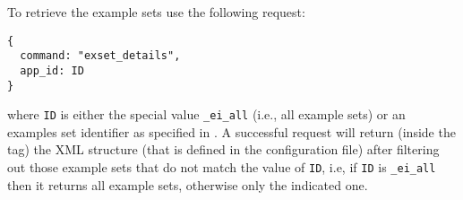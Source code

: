 To retrieve the example sets use the following request:

\bigskip
\begin{lstlisting}
{
  command: "exset_details",
  app_id: ID
}
\end{lstlisting}

\bigskip
\noindent
where \texttt{ID} is either the special value \texttt{\_ei\_all}
(i.e., all example sets) or an examples set identifier as specified in
.
%
A successful request will return (inside the  tag) the
XML structure  (that is defined in the
configuration file) after filtering out those example sets that do not
match the value of \texttt{ID}, i.e, if \texttt{ID} is
\texttt{\_ei\_all} then it returns all example sets, otherwise only
the indicated one.
